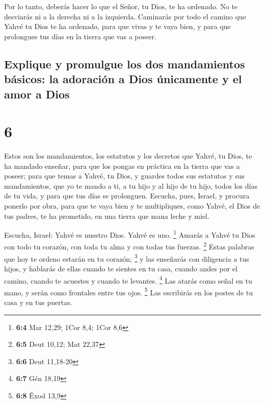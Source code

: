  Por lo tanto, deberás hacer lo que el Señor, tu Dios, te
ha ordenado. No te desviarás ni a la derecha ni a la izquierda.
 Caminarás por todo el camino que Yahvé tu Dios te ha
ordenado, para que vivas y te vaya bien, y para que prolongues tus días
en la tierra que vas a poseer.

\hypertarget{explique-y-promulgue-los-dos-mandamientos-buxe1sicos-la-adoraciuxf3n-a-dios-uxfanicamente-y-el-amor-a-dios}{%
\subsection{Explique y promulgue los dos mandamientos básicos: la
adoración a Dios únicamente y el amor a
Dios}\label{explique-y-promulgue-los-dos-mandamientos-buxe1sicos-la-adoraciuxf3n-a-dios-uxfanicamente-y-el-amor-a-dios}}

\hypertarget{section-5}{%
\section{6}\label{section-5}}

 Estos son los mandamientos, los estatutos y los decretos
que Yahvé, tu Dios, te ha mandado enseñar, para que los pongas en
práctica en la tierra que vas a poseer;  para que temas a
Yahvé, tu Dios, y guardes todos sus estatutos y sus mandamientos, que yo
te mando a ti, a tu hijo y al hijo de tu hijo, todos los días de tu
vida, y para que tus días se prolonguen.  Escucha, pues,
Israel, y procura ponerlo por obra, para que te vaya bien y te
multipliques, como Yahvé, el Dios de tus padres, te ha prometido, en una
tierra que mana leche y miel.

 Escucha, Israel: Yahvé es nuestro Dios. Yahvé es uno.
\footnote{\textbf{6:4} Mar 12,29; 1Cor 8,4; 1Cor 8,6} 
Amarás a Yahvé tu Dios con todo tu corazón, con toda tu alma y con todas
tus fuerzas. \footnote{\textbf{6:5} Deut 10,12; Mat 22,37}
 Estas palabras que hoy te ordeno estarán en tu corazón;
\footnote{\textbf{6:6} Deut 11,18-20}  y las enseñarás con
diligencia a tus hijos, y hablarás de ellas cuando te sientes en tu
casa, cuando andes por el camino, cuando te acuestes y cuando te
levantes. \footnote{\textbf{6:7} Gén 18,19}  Las atarás
como señal en tu mano, y serán como frontales entre tus ojos.
\footnote{\textbf{6:8} Éxod 13,9}  Las escribirás en los
postes de tu casa y en tus puertas.


